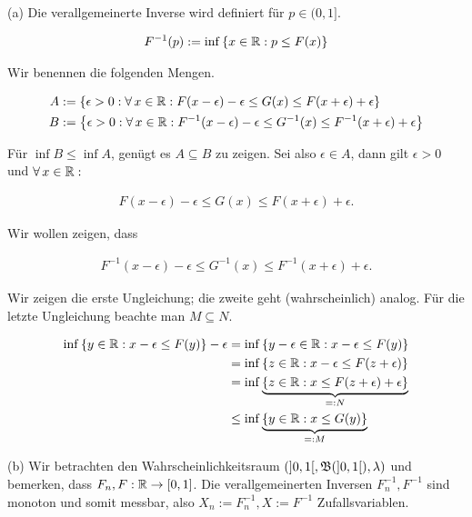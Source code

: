 \begin{solution}

(a) Die verallgemeinerte Inverse wird definiert für $p \in (0, 1]$.

\begin{align*}
  F^{-1}(p) := \inf \left \{ x \in \mathbb{R}: p \leq F(x) \right \}
\end{align*}

Wir benennen die folgenden Mengen.

\begin{align*}
  A  & := \left \{ 
    \epsilon > 0:
    \forall \, x \in \mathbb{R}:
    F(x - \epsilon) - \epsilon \leq
    G(x) \leq
    F(x + \epsilon) + \epsilon
   \right \} \\
  B & := \left \{ 
    \epsilon > 0:
    \forall \, x \in \mathbb{R}:
    F^{-1}(x - \epsilon) - \epsilon \leq
    G^{-1}(x) \leq
    F^{-1}(x + \epsilon) + \epsilon
   \right \}
\end{align*}

Für $\inf B \leq \inf A$, genügt es $A \subseteq B$ zu zeigen. Sei also $\epsilon \in A$, dann gilt $\epsilon > 0$ und $\forall \, x \in \mathbb{R}:$

\begin{align*}
  F(x - \epsilon) - \epsilon \leq
  G(x) \leq
  F(x + \epsilon) + \epsilon.
\end{align*}

Wir wollen zeigen, dass

\begin{align*}
  F^{-1}(x - \epsilon) - \epsilon \leq
  G^{-1}(x) \leq
  F^{-1}(x + \epsilon) + \epsilon.
\end{align*}

Wir zeigen die erste Ungleichung; die zweite geht (wahrscheinlich) analog. Für die letzte Ungleichung beachte man $M \subseteq N$.

\begin{align*}
  \inf \left \{ y \in \mathbb{R}: x - \epsilon \leq F(y) \right \} - \epsilon
  & = \inf \left \{ y - \epsilon \in \mathbb{R}: x - \epsilon \leq F(y) \right \} \\
  & = \inf \left \{ z \in \mathbb{R}: x - \epsilon \leq F(z + \epsilon) \right \} \\
  & = \inf \underbrace
      {
        \left \{ z \in \mathbb{R}: x \leq F(z + \epsilon) + \epsilon \right \}
      }_{=: N} \\
  & \leq \inf \underbrace
      {
        \left \{ y \in \mathbb{R}: x \leq G(y) \right \}
      }_{=: M}
\end{align*}

(b) Wir betrachten den Wahrscheinlichkeitsraum $(]0, 1[, \mathfrak{B}(]0, 1[), \lambda)$ und bemerken, dass $F_n, F: \mathbb{R} \to [0, 1]$. Die verallgemeinerten Inversen $F_n^{-1}, F^{-1}$ sind monoton und somit messbar, also $X_n := F_n^{-1}, X := F^{-1}$ Zufallsvariablen. \\


\end{solution}
